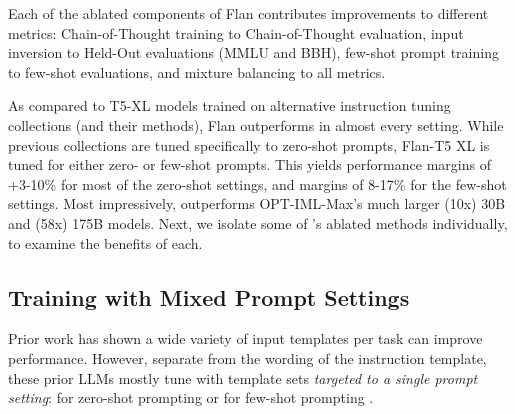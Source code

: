 \begin{table*}[ht]
\begin{tabular}{l | ccccc}
    \bottomrule
    \end{tabular}
    \caption{
    \textbf{Method Ablations (top)} show the importance of each method for Flan-T5 XL.
    \textbf{Collection Ablations (bottom)} evaluate Flan-T5 XL against T5-XL finetuned on other instruction tuning collections: FLAN 2021, P3++, and Super-Natural Instructions.
    \textbf{\flantwo{} - Next Best T5-XL} shows the improvement of Flan-T5 XL over the next best T5-XL (comparatively sized) finetuned on another collection.
    Metrics are reported in both zero-shot / few-shot settings across Held-In, Chain-of-Thought, and Held-Out (MMLU, BBH) tasks. \\
    \textsuperscript{\textdagger} We also inlcude the results reported by OPT-IML \citep{iyer2022optiml} and GLM-130B \citep{zeng2022glm}.
    }
    \label{tab:ablations}
\end{table*}
\endgroup

Each of the ablated components of Flan contributes improvements to different metrics: Chain-of-Thought training to Chain-of-Thought evaluation, input inversion to Held-Out evaluations (MMLU and BBH), few-shot prompt training to few-shot evaluations, and mixture balancing to all metrics.

As compared to T5-XL models trained on alternative instruction tuning collections (and their methods), Flan outperforms in almost every setting.
While previous collections are tuned specifically to zero-shot prompts, Flan-T5 XL is tuned for either zero- or few-shot prompts.
This yields performance margins of +3-10\% for most of the zero-shot settings, and margins of 8-17\% for the few-shot settings.
Most impressively, \flantwo{} outperforms OPT-IML-Max's much larger (10x) 30B and (58x) 175B models.
Next, we isolate some of \flantwo{}'s ablated methods individually, to examine the benefits of each.

\subsection{Training with Mixed Prompt Settings}
\label{sec:mtft-zs-fs}
Prior work has shown a wide variety of input templates per task can improve performance.
However, separate from the wording of the instruction template, these prior LLMs mostly tune with template sets \emph{targeted to a single prompt setting}: for zero-shot prompting \citep{wei2021finetuned, sanh2021multitask, aghajanyan-etal-2021-muppet,aribandi2021ext5} or for few-shot prompting \citep{min-etal-2022-metaicl, wang2022benchmarking}.


